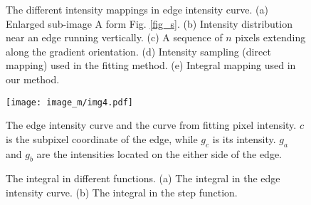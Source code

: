 \begin{figure}[h]
   \centering
    \caption{The different intensity mappings in edge intensity curve. (a) Enlarged sub-image A form Fig. \ref{fig_s}. (b) Intensity distribution near an edge running vertically. (c) A sequence of $n$ pixels extending along the gradient orientation. 
    (d) Intensity sampling (direct mapping) used in the fitting method. (e) Integral mapping used in our method.}  
    \label{fig5}
\end{figure}

\begin{figure}[b]
\begin{minipage}[t!]{0.45\linewidth}
    \centering
    \texttt{[image: image\_m/img4.pdf]} 
    \caption{The edge intensity curve and the curve from fitting pixel intensity. $c$ is the subpixel coordinate of the edge, while $g_c$ is its intensity. $g_a$ and $g_b$ are the intensities located on the either side of the edge.}
    \label{fig4}
\end{minipage}%
\hspace{5mm}
\begin{minipage}[t!]{0.45\linewidth}
    \centering
	\caption{The integral in different functions. (a) The integral in the edge intensity curve. (b) The integral in the step function.}
    \label{fig3}
\end{minipage}

\end{figure}